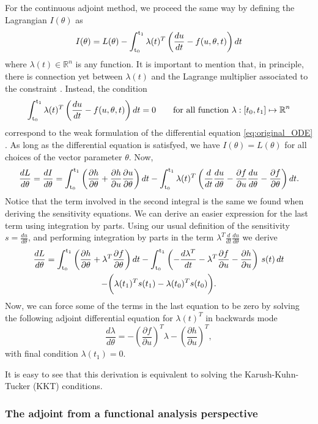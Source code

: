 For the continuous adjoint method, we proceed the same way by defining the Lagrangian $I(\theta)$ as 
\begin{equation}
    I(\theta) = L(\theta) - \operatorname{\int_{t_0}^{t_1}} \lambda(t)^T \left( \frac{du}{dt} - f(u, \theta, t) \right) dt
\end{equation}
where $\lambda(t) \in \mathbb R^n$ is any function. 
It is important to mention that, in principle, there is connection yet between $\lambda (t)$ and the Lagrange multiplier associated to the constraint \cite{Givoli_2021}. 
Instead, the condition 
\begin{equation}
    \operatorname{\int_{t_0}^{t_1}} \lambda(t)^T \left( \frac{du}{dt} - f(u, \theta, t) \right) dt = 0 \qquad \text{for all function } \lambda : [t_0, t_1] \mapsto \operatorname{\mathbb{R}}^n
\end{equation}
correspond to the weak formulation of the differential equation \eqref{eq:original_ODE} \cite{brezis2011functional}.
As long as the differential equation is satisfyed, we have $I(\theta) = L(\theta)$ for all choices of the vector parameter $\theta$. 
Now, 
\begin{equation}
    \frac{dL}{d\theta} = \frac{dI}{d\theta} = 
    \operatorname{\int_{t_0}^{t_1}} \left( \frac{\partial h}{\partial \theta} + \frac{\partial h}{\partial u} \frac{\partial u}{\partial \theta} \right) dt
    - 
    \operatorname{\int_{t_0}^{t_1}} \lambda(t)^T \left( \frac{d}{dt} \frac{du}{d\theta} - \frac{\partial f}{\partial u} \frac{du}{d\theta} - \frac{\partial f}{\partial \theta} \right) dt.
\end{equation}
Notice that the term involved in the second integral is the same we found when deriving the sensitivity equations. 
We can derive an easier expression for the last term using integration by parts. 
Using our usual definition of the sensitivity $s = \frac{du}{d\theta}$, and performing integration by parts in the term $\lambda^T \frac{d}{dt} \frac{du}{d\theta}$ we derive 
\begin{multline}
    \frac{dL}{d\theta}
    = 
    \operatorname{\int_{t_0}^{t_1}} \left( \frac{\partial h}{\partial \theta} + \lambda^T \frac{\partial f}{\partial \theta} \right) dt 
    - 
    \operatorname{\int_{t_0}^{t_1}} \left( - \frac{d\lambda^T}{dt} - \lambda^T \frac{\partial f}{\partial u} - \frac{\partial h}{\partial u} \right) \, s(t) \, dt \\
    -
    \bigg ( \lambda(t_1)^T s(t_1) - \lambda(t_0)^T s(t_0) \bigg ).
    \label{eq:continous-adjoint-loss}
\end{multline}
Now, we can force some of the terms in the last equation to be zero by solving the following adjoint differential equation for $\lambda(t)^T$ in backwards mode
\begin{equation}
    \frac{d\lambda}{d\theta} = - \left(\frac{\partial f}{\partial u}\right)^T \lambda - \left( \frac{\partial h}{\partial u} \right)^T,
    \label{eq:continuous-adjoint}
\end{equation}
with final condition $\lambda(t_1) = 0$. 

It is easy to see that this derivation is equivalent to solving the Karush-Kuhn-Tucker (KKT) conditions. 

\subsubsection{The adjoint from a functional analysis perspective}